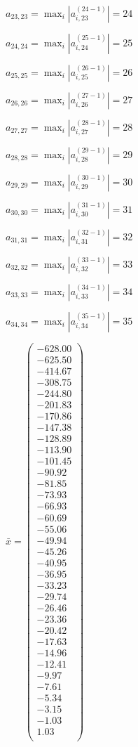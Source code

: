 \documentclass[a4paper,12pt]{article}
\begin{document}
$a _{ 23, 23 } =  \max _i |a _{ i, 23 } ^{ (24 - 1) } | = 24$

$a _{ 24, 24 } =  \max _i |a _{ i, 24 } ^{ (25 - 1) } | = 25$

$a _{ 25, 25 } =  \max _i |a _{ i, 25 } ^{ (26 - 1) } | = 26$

$a _{ 26, 26 } =  \max _i |a _{ i, 26 } ^{ (27 - 1) } | = 27$

$a _{ 27, 27 } =  \max _i |a _{ i, 27 } ^{ (28 - 1) } | = 28$

$a _{ 28, 28 } =  \max _i |a _{ i, 28 } ^{ (29 - 1) } | = 29$

$a _{ 29, 29 } =  \max _i |a _{ i, 29 } ^{ (30 - 1) } | = 30$

$a _{ 30, 30 } =  \max _i |a _{ i, 30 } ^{ (31 - 1) } | = 31$

$a _{ 31, 31 } =  \max _i |a _{ i, 31 } ^{ (32 - 1) } | = 32$

$a _{ 32, 32 } =  \max _i |a _{ i, 32 } ^{ (33 - 1) } | = 33$

$a _{ 33, 33 } =  \max _i |a _{ i, 33 } ^{ (34 - 1) } | = 34$

$a _{ 34, 34 } =  \max _i |a _{ i, 34 } ^{ (35 - 1) } | = 35$

$\bar { x } = \begin{pmatrix}
-628.00 \\
-625.50 \\
-414.67 \\
-308.75 \\
-244.80 \\
-201.83 \\
-170.86 \\
-147.38 \\
-128.89 \\
-113.90 \\
-101.45 \\
-90.92 \\
-81.85 \\
-73.93 \\
-66.93 \\
-60.69 \\
-55.06 \\
-49.94 \\
-45.26 \\
-40.95 \\
-36.95 \\
-33.23 \\
-29.74 \\
-26.46 \\
-23.36 \\
-20.42 \\
-17.63 \\
-14.96 \\
-12.41 \\
-9.97 \\
-7.61 \\
-5.34 \\
-3.15 \\
-1.03 \\
1.03 \\
\end{pmatrix}
$
\end{document}
